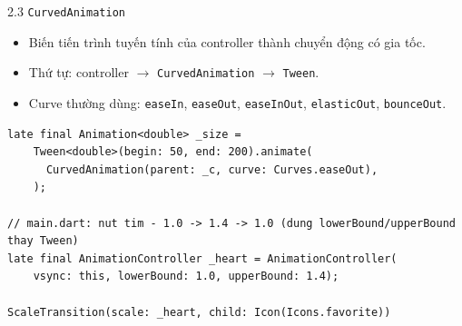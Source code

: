 \documentclass[aspectratio=169,10pt]{beamer}
\begin{document}
\begin{frame}[fragile]{2.3 \texttt{CurvedAnimation}}
  \begin{itemize}
    \item Biến tiến trình tuyến tính của controller thành chuyển động có gia tốc.
    \item Thứ tự: controller $\rightarrow$ \texttt{CurvedAnimation} $\rightarrow$ \texttt{Tween}.
    \item Curve thường dùng: \texttt{easeIn}, \texttt{easeOut}, \texttt{easeInOut},
          \texttt{elasticOut}, \texttt{bounceOut}.
  \end{itemize}
\begin{lstlisting}[frame=single,
  basicstyle=\fontfamily{phv}\selectfont\footnotesize]
late final Animation<double> _size =
    Tween<double>(begin: 50, end: 200).animate(
      CurvedAnimation(parent: _c, curve: Curves.easeOut),
    );

// main.dart: nut tim - 1.0 -> 1.4 -> 1.0 (dung lowerBound/upperBound thay Tween)
late final AnimationController _heart = AnimationController(
    vsync: this, lowerBound: 1.0, upperBound: 1.4);

ScaleTransition(scale: _heart, child: Icon(Icons.favorite))
\end{lstlisting}
\end{frame}
\end{document}
